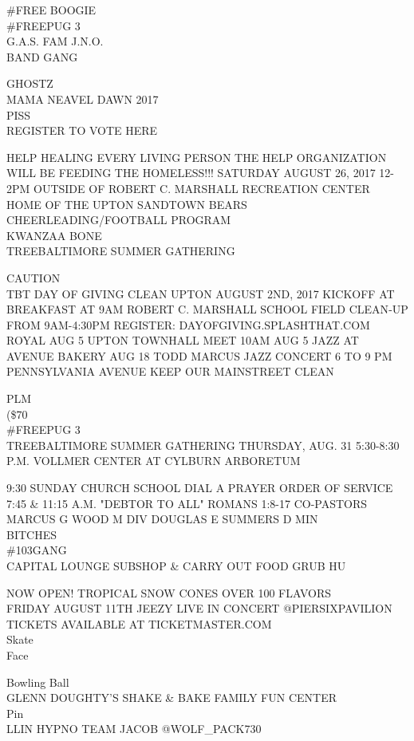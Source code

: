 \documentclass[10pt,letterpaper]{article}
\begin{document}
\#FREE BOOGIE\\
\#FREEPUG 3\\
G.A.S. FAM J.N.O.\\
BAND GANG

GHOSTZ\\
MAMA NEAVEL DAWN 2017\\
PISS\\
REGISTER TO VOTE HERE

HELP HEALING EVERY LIVING PERSON THE HELP ORGANIZATION WILL BE FEEDING THE HOMELESS!!! SATURDAY AUGUST 26, 2017 12{-}2PM OUTSIDE OF ROBERT C. MARSHALL RECREATION CENTER\\
HOME OF THE UPTON SANDTOWN BEARS CHEERLEADING/FOOTBALL PROGRAM\\
KWANZAA BONE\\
TREEBALTIMORE SUMMER GATHERING

CAUTION\\
TBT DAY OF GIVING CLEAN UPTON AUGUST 2ND, 2017 KICKOFF AT BREAKFAST AT 9AM ROBERT C. MARSHALL SCHOOL FIELD CLEAN{-}UP FROM 9AM{-}4:30PM REGISTER: DAYOFGIVING.SPLASHTHAT.COM\\
ROYAL AUG 5 UPTON TOWNHALL MEET 10AM AUG 5 JAZZ AT AVENUE BAKERY AUG 18 TODD MARCUS JAZZ CONCERT 6 TO 9 PM\\
PENNSYLVANIA AVENUE KEEP OUR MAINSTREET CLEAN

PLM\\
(\$70\\
\#FREEPUG 3\\
TREEBALTIMORE SUMMER GATHERING THURSDAY, AUG. 31 5:30{-}8:30 P.M. VOLLMER CENTER AT CYLBURN ARBORETUM

9:30 SUNDAY CHURCH SCHOOL DIAL A PRAYER ORDER OF SERVICE 7:45 \& 11:15 A.M. "DEBTOR TO ALL" ROMANS 1:8{-}17 CO{-}PASTORS MARCUS G WOOD M DIV DOUGLAS E SUMMERS D MIN\\
BITCHES\\
\#103GANG\\
CAPITAL LOUNGE SUBSHOP \& CARRY OUT FOOD GRUB HU

NOW OPEN!  TROPICAL SNOW CONES OVER 100 FLAVORS\\
FRIDAY AUGUST 11TH JEEZY LIVE IN CONCERT @PIERSIXPAVILION TICKETS AVAILABLE AT TICKETMASTER.COM\\
Skate\\
Face

Bowling Ball\\
GLENN DOUGHTY'S SHAKE \& BAKE FAMILY FUN CENTER\\
Pin\\
LLIN HYPNO TEAM JACOB @WOLF\_PACK730
\end{document}
